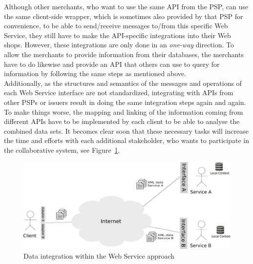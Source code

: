 Although other merchants, who want to use the same \gls{API} from the \gls{PSP}, can use the same client-side wrapper, which is sometimes also provided by that \gls{PSP} for convenience, to be able to send/receive messages to/from this specific Web Service, they still have to make the \gls{API}-specific integrations into their Web shops. However, these integrations are only done in an \emph{one-way} direction. To allow the merchants to provide information from their databases, the merchants have to do likewise and provide an \gls{API} that others can use to query for information by following the same steps as mentioned above. \\

Additionally, as the structures and semantics of the messages and operations of each Web Service interface are not standardized, integrating with \gls{API}s from other \gls{PSP}s or issuers result in doing the same integration steps again and again. To make things worse, the mapping and linking of the information coming from different \gls{API}s have to be implemented by each client to be able to analyse the combined data sets. It becomes clear soon that these necessary tasks will increase the time and efforts with each additional stakeholder, who wants to participate in the collaborative system, see Figure~\ref{fig:web_services_scenario}. \\

\begin{figure}[!ht]
  \centering
  \includegraphics[width=0.9\columnwidth]{images/web-services-scenario.pdf}
  \caption{Data integration within the Web Service approach}
\label{fig:web_services_scenario}
\end{figure}


